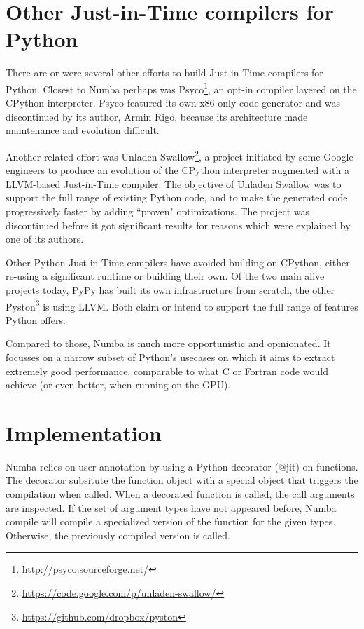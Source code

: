 \documentclass{acm_proc_article-sp}
\begin{document}
\section{Other Just-in-Time compilers for Python}

There are or were several other efforts to build Just-in-Time compilers
for Python.  Closest to Numba perhaps was
Psyco\footnote{\url{http://psyco.sourceforge.net/}}, an opt-in compiler layered
on the CPython interpreter.  Psyco featured its own x86-only code generator
and was discontinued by its author, Armin Rigo, because its architecture
made maintenance and evolution difficult. \cite{rigo2004representation}

Another related effort was
Unladen Swallow\footnote{\url{https://code.google.com/p/unladen-swallow/}},
a project initiated by some
Google engineers to produce an evolution of the CPython interpreter augmented
with a LLVM-based Just-in-Time compiler.
The objective of Unladen Swallow was to support the full range of existing
Python code, and to make the generated code progressively faster by adding
``proven" optimizations.  The project was discontinued before it got
significant results for reasons which were explained by one of its authors.
\cite{kleckner:unladen_swallow_post_mortem}

Other Python Just-in-Time compilers have avoided building on CPython,
either re-using a significant runtime or building their own.  Of the
two main alive projects today, PyPy \cite{pypy:pypy} has built its
own infrastructure from scratch, the other
Pyston\footnote{\url{https://github.com/dropbox/pyston}}
is using LLVM.  Both claim or intend to support the full range of features
Python offers.

Compared to those, Numba is much more opportunistic and opinionated.
It focusses on a narrow subset of Python's usecases on which it
aims to extract extremely good performance, comparable to what C or Fortran
code would achieve (or even better, when running on the GPU).


\section{Implementation}

Numba relies on user annotation by using a Python decorator (@jit) on functions.
The decorator subsitute the function object with a special object that triggers
the compilation when called. When a decorated function is called,
the call arguments are inspected. If the set of argument types have not appeared
before, Numba compile will compile a specialized version of the function for the
given types. Otherwise, the previously compiled version is called.
\end{document}
